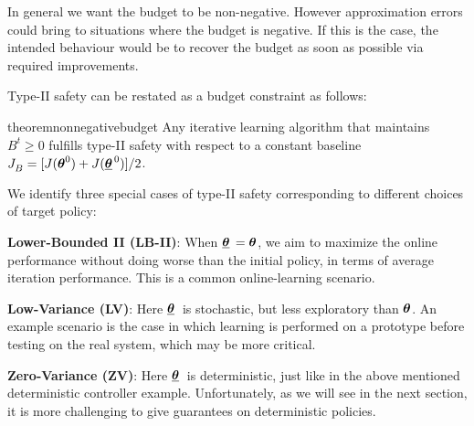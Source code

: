 \begin{note}
In general we want the budget to be non-negative. However approximation errors could bring to situations where the budget is negative. If this is the case, the intended behaviour would be to recover the budget as soon as possible via required improvements.
\end{note}

Type-II safety can be restated as a budget constraint as follows:
\begin{restatable}{theorem}{nonnegativebudget}\label{th:nonnegativebudget}
Any iterative learning algorithm that maintains $B^t \geq 0$ fulfills type-II safety with respect to a constant baseline $\jbase[] = [J(\vtheta^0) + J(\vtarget[0])] / 2$.
\end{restatable}
%
We identify three special cases of type-II safety corresponding to different choices of target policy:

\textbf{Lower-Bounded II (LB-II)}: When $\vtarget[]=\vtheta$, we aim to maximize the online performance without doing worse than the initial policy, in terms of average iteration performance. This is a common online-learning scenario.

\textbf{Low-Variance (LV)}:  Here $\vtarget[]$ is stochastic, but less exploratory than $\vtheta$. An example scenario is the case in which learning is performed on a prototype before testing on the real system, which may be more critical. 

\textbf{Zero-Variance (ZV)}: Here $\vtarget[]$ is deterministic, just like in the above mentioned deterministic controller example. Unfortunately, as we will see in the next section, it is more challenging to give guarantees on deterministic policies.  


